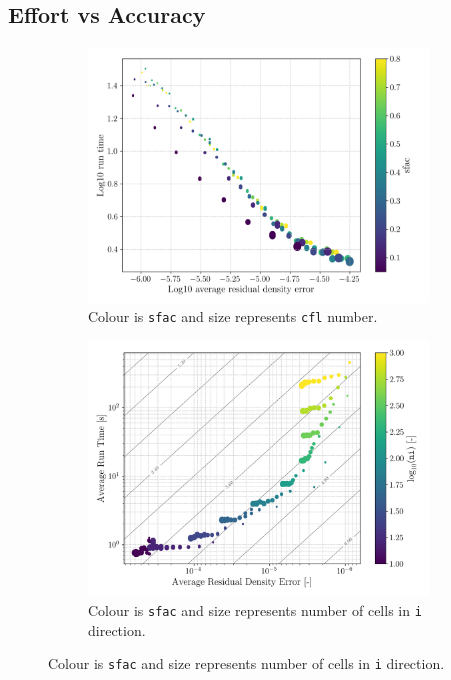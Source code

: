 \documentclass{article}
\begin{document}
\subsection{Effort vs Accuracy}

\begin{figure}[H]
    \begin{subfigure}{0.49\textwidth}
        \centering
        \includegraphics[width=0.99\textwidth]{figures/effort_vs_accuracy_cfl.png}
        \caption{Colour is \texttt{sfac} and size represents \texttt{cfl} number.}
        \label{fig:effort_vs_accuracy_cfl}
    \end{subfigure}
    \begin{subfigure}{0.49\textwidth}
        \centering
        \includegraphics[width=0.99\textwidth]{figures/effort_vs_accuracy_ni.png}
        \caption{Colour is \texttt{sfac} and size represents number of cells in \texttt{i} direction.}
        \label{fig:effort_vs_accuracy_ni}
    \end{subfigure}
\end{figure}
\end{document}
